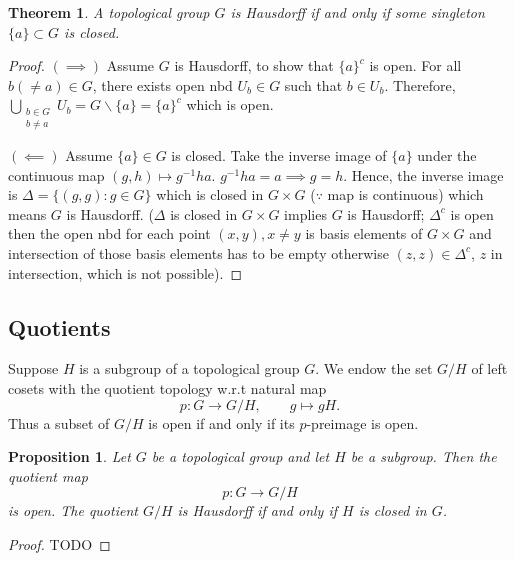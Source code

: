 \documentclass[12pt,reqno]{amsart}
\theoremstyle{plain}
\newtheorem{thm}{Theorem}
\newtheorem{prop}{Proposition}
\theoremstyle{definition}
\begin{document}
\begin{thm}
    A topological group $G$ is Hausdorff if and only if some singleton $\{a\} \subset G$ is closed.
\end{thm}
\begin{proof}
    $(\implies)$ Assume $G$ is Hausdorff, to show that $\{a\}^c$ is open. For all $b(\neq a) \in G$, there exists open nbd $U_b \in G$ such that $b \in U_b$. Therefore, $\bigcup\limits_{\substack{b\in G \\ b \neq a}} U_b = G\backslash\{a\} = \{a\}^c$ which is open.

    $(\impliedby)$ Assume $\{a\} \in G$ is closed. Take the inverse image of $\{a\}$ under the continuous map $(g,h) \mapsto g^{-1}ha$. $g^{-1}ha = a \implies g = h$. Hence, the inverse image is $\Delta = \{(g,g) \colon g \in G\}$ which is closed in $G \times G$ ($\because$ map is continuous) which means $G$ is Hausdorff. ($\Delta$ is closed in $G \times G$ implies $G$ is Hausdorff; $\Delta^c$ is open then the open nbd for each point $(x,y), x \neq y$ is basis elements of $G \times G$ and intersection of those basis elements has to be empty otherwise $(z,z) \in \Delta^c$, $z$ in intersection, which is not possible).
\end{proof}

\subsection{Quotients}

Suppose $H$ is a subgroup of a topological group $G$. We endow the set $G/H$ of left cosets with the quotient topology w.r.t natural map
$$ p \colon G \to G/H, \qquad g \mapsto gH.$$
Thus a subset of $G/H$ is open if and only if its $p$-preimage is open.

\begin{prop}
    Let $G$ be a topological group and let $H$ be a subgroup. Then the quotient map
    $$ p \colon G \to G/H$$
    is open. The quotient $G/H$ is Hausdorff if and only if $H$ is closed in $G$.
\end{prop}
\begin{proof}
    TODO
\end{proof}
\end{document}
